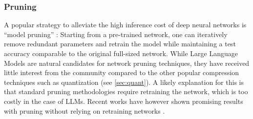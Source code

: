 \documentclass[conference]{IEEEtran}
\begin{document}





\subsubsection{Pruning}

A popular strategy to alleviate the high inference cost of deep neural networks is ``model pruning'' \cite{Lecun_Pruning, Hassibi_Pruning, Han_Pruning}: Starting from a pre-trained network, one can iteratively remove redundant parameters and retrain the model while maintaining a test accuracy comparable to the original full-sized network. While Large Language Models are natural candidates for network pruning techniques, they have received little interest from the community compared to the other popular compression techniques such as quantization (see \ref{sec:quant}). A likely explanation for this is that standard pruning methodologies require retraining the network, which is too costly in the case of LLMs. Recent works have however shown promising results with pruning without relying on retraining networks \cite{pruning_llm_1, pruning_llm_2}.

\end{document}

